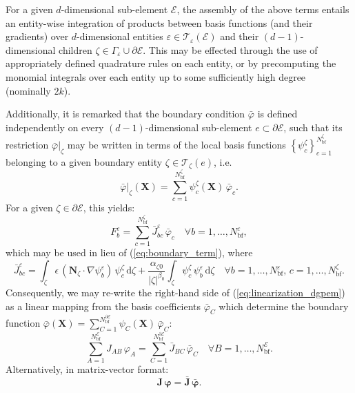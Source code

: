 	For a given $d$-dimensional sub-element $\mathcal{E}$, the assembly of the above terms entails an entity-wise integration of products between basis functions (and their gradients) over $d$-dimensional entities $\varepsilon \in \mathcal{T}_\varepsilon (\mathcal{E})$ and their $(d-1)$-dimensional children $\zeta \in \Gamma_\varepsilon \cup \partial \mathcal{E}$. This may be effected through the use of appropriately defined quadrature rules on each entity, or by precomputing the monomial integrals over each entity up to some sufficiently high degree (nominally $2k$).
	
	Additionally, it is remarked that the boundary condition $\bar{\varphi}$ is defined independently on every $(d-1)$-dimensional sub-element $e \subset \partial \mathcal{E}$, such that its restriction $\bar{\varphi}|_\zeta$ may be written in terms of the local basis functions $\left\{ \psi^{\zeta}_c \right\}_{c=1}^{N^\zeta_{\mathrm b\mathrm f}}$ belonging to a given boundary entity $\zeta \in \mathcal{T}_{\zeta} (e)$, i.e.
	\begin{equation}
			\bar{\varphi}|_\zeta (\bm{X}) = \sum_{c=1}^{N^\zeta_{\mathrm b\mathrm f}} \psi^\zeta_c (\bm{X}) \, \bar{\varphi}_c.
	\end{equation}
	For a given $\zeta \in \partial \mathcal{E}$, this yields:
	\begin{equation}
		F^{\varepsilon}_b = \sum_{c=1}^{N^\zeta_{\mathrm b\mathrm f}} \bar{J}^{\varepsilon}_{bc} \, \bar{\varphi}_c \quad \forall b = 1, \ldots, N^{\varepsilon}_{\mathrm b\mathrm f},
	\end{equation}
	which may be used in lieu of (\ref{eq:boundary_term}), where
	\begin{equation}
		\bar{J}^{\varepsilon}_{bc} = \int_{\zeta} \epsilon \, (\bm{N}_{\zeta} \cdot \nabla \psi_b^{\varepsilon}) \, \psi^\zeta_c  \, \mathrm d \zeta + \frac{\alpha_{\zeta0}}{|\zeta|^{\beta_0}} \int_{\zeta} \psi^\zeta_c \, \psi_b^{\varepsilon} \, \mathrm d \zeta \quad \forall b = 1, \ldots, N^{\varepsilon}_{\mathrm b\mathrm f}, \, c = 1, \ldots, N^\zeta_{\mathrm b\mathrm f}.
	\end{equation}
	Consequently, we may re-write the right-hand side of (\ref{eq:linearization_dgpem}) as a linear mapping from the basis coefficients $\bar{\varphi}_C$ which determine the boundary function $\bar{\varphi} (\bm{X}) = \sum_{C=1}^{N^{\partial \mathcal{E}}_{\mathrm b\mathrm f}} \psi_C (\bm{X}) \, \bar{\varphi}_C$:
	\begin{equation}
		\sum_{A=1}^{N^{\mathcal{E}}_{\mathrm b\mathrm f}} J_{AB} \, \varphi_A = \sum_{C=1}^{N^{\partial \mathcal{E}}_{\mathrm b\mathrm f}} \bar{J}_{BC} \, \bar{\varphi}_C \quad \forall B = 1, \ldots, N^{\mathcal{E}}_{\mathrm b\mathrm f}.
	\end{equation}
	Alternatively, in matrix-vector format:
	\begin{equation}
		\bm{J} \, \boldsymbol{\varphi} = \bar{\bm{J}} \, \bar{\boldsymbol{\varphi}}.
		\label{eq:dgpem_linear_system}
	\end{equation}
	
